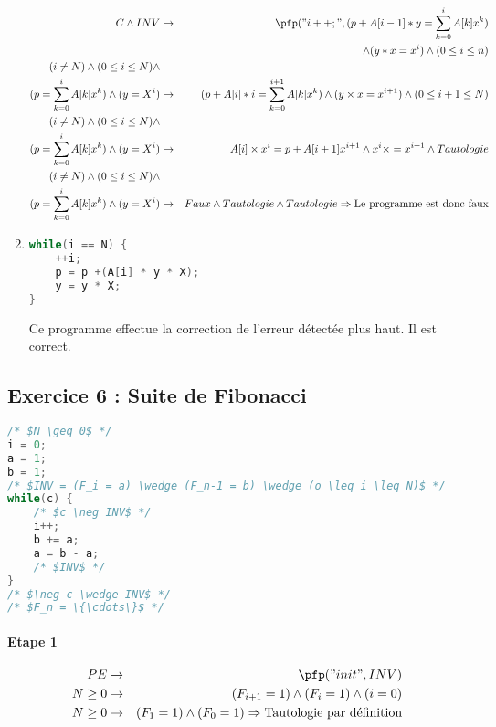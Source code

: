 \begin{enumerate}
\begin{eqnarray*}
			C \wedge INV &\rightarrow& \pfp ("i++;", (p+A[i-1]*y = \sum^i_{k=0}A[k]x^k)\\&&\wedge(y*x=x^i)\wedge(0\leq i\leq n )\\
			(i \neq N) \wedge (0\leq i \leq N) \wedge\\ (p = \sum^i_{k=0} A[k] x^k) \wedge (y=X^i) &\rightarrow& (p+A[i] * i = \sum^{i+1}_{k=0}A[k]x^k) \wedge (y \times x = x^{i+1}) \wedge (0 \leq i+1 \leq N)\\
			(i \neq N) \wedge (0\leq i \leq N) \wedge \\(p = \sum^i_{k=0} A[k] x^k) \wedge (y=X^i) &\rightarrow& A[i] \times x^i = p+A[i+1]x^{i+1} \wedge x^i \times = x^{i+1} \wedge Tautologie \\
			(i \neq N) \wedge (0\leq i \leq N) \wedge \\(p = \sum^i_{k=0} A[k] x^k) \wedge (y=X^i) &\rightarrow& Faux \wedge Tautologie \wedge Tautologie\Rightarrow \textrm{Le programme est donc faux} \\
		\end{eqnarray*}
\item \begin{lstlisting}[language=C,numbers=none]
while(i == N) { 
	++i;	
	p = p +(A[i] * y * X); 
	y = y * X; 
}
\end{lstlisting}
Ce programme effectue la correction de l'erreur détectée plus haut. Il est correct.
\end{enumerate}

\subsection{Exercice 6 : Suite de Fibonacci}

\begin{lstlisting}[language=C,numbers=none]
/* $N \geq 0$ */
i = 0; 
a = 1; 
b = 1;
/* $INV = (F_i = a) \wedge (F_n-1 = b) \wedge (o \leq i \leq N)$ */
while(c) {
	/* $c \neg INV$ */
	i++;
	b += a;
	a = b - a;
	/* $INV$ */
}
/* $\neg c \wedge INV$ */
/* $F_n = \{\cdots\}$ */
\end{lstlisting}

\paragraph{Etape 1}
\begin{eqnarray*}
	PE &\rightarrow& \pfp("init", INV)\\
	N \geq 0 &\rightarrow& (F_{i+1} = 1) \wedge (F_i = 1) \wedge (i=0)\\
	N \geq 0 &\rightarrow& (F_1 = 1) \wedge (F_0 = 1)\Rightarrow \textrm{Tautologie par définition}
\end{eqnarray*}
